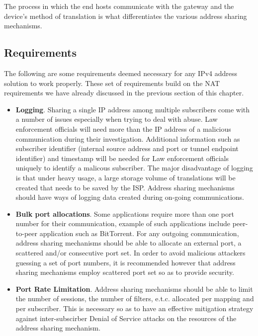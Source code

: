 \documentclass[iwp,first]{luthesis}
\begin{document}
The process in which the end hosts communicate with the gateway and the device's method of translation is what differentiates the various address sharing mechanisms. 


\subsection{Requirements}

The following are some requirements deemed necessary for any IPv4 address solution to work properly. These set of requirements build on the NAT requirements we have already discussed in the previous section of this chapter. 

\begin{itemize}

\item {\bf Logging}. Sharing a single IP address among multiple subscribers come with a number of issues especially when trying to deal with abuse. Law enforcement officials will need more than the IP address of a malicious communication during their investigation. Additional information such as subscriber identifier (internal source address and port or tunnel endpoint identifier) and timestamp will be needed for Law enforcement officials uniquely to identify a malicous subscriber. The major disadvantage of logging is that under heavy usage, a large storage volume of translations will be created that needs to be saved by the ISP. Address sharing mechanisms should have ways of logging data created during on-going communications. 

\item {\bf Bulk port allocations}. Some applications require more than one port number for their communication, example of such applications include peer-to-peer application such as BitTorrent. For any outgoing communication, address sharing mechanisms should be able to allocate an external port, a scattered and/or consecutive port set. In order to avoid malicious attackers guessing a set of port numbers, it is recommended however that address sharing mechanisms employ scattered port set so as to provide security.

\item {\bf Port Rate Limitation}. Address sharing mechanisms should be able to limit the number of sessions, the number of filters, e.t.c. allocated per mapping and per subscriber. This is necessary so as to have an effective mitigation strategy against inter-subscirber Denial of Service attacks on the resources of the address sharing mechanism. 

\end{itemize}
\end{document}
